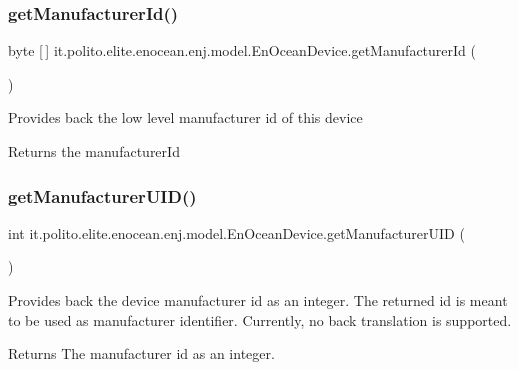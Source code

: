 \subsubsection{\texorpdfstring{get\+Manufacturer\+Id()}{getManufacturerId()}}
{\footnotesize\ttfamily byte \mbox{[}$\,$\mbox{]} it.\+polito.\+elite.\+enocean.\+enj.\+model.\+En\+Ocean\+Device.\+get\+Manufacturer\+Id (\begin{DoxyParamCaption}{ }\end{DoxyParamCaption})}

Provides back the low level manufacturer id of this device

\begin{DoxyReturn}{Returns}
the manufacturer\+Id 
\end{DoxyReturn}
\hypertarget{classit_1_1polito_1_1elite_1_1enocean_1_1enj_1_1model_1_1_en_ocean_device_a4146d6a1aa6bcac98f038151e4581708}{}\label{classit_1_1polito_1_1elite_1_1enocean_1_1enj_1_1model_1_1_en_ocean_device_a4146d6a1aa6bcac98f038151e4581708} 
\subsubsection{\texorpdfstring{get\+Manufacturer\+U\+I\+D()}{getManufacturerUID()}}
{\footnotesize\ttfamily int it.\+polito.\+elite.\+enocean.\+enj.\+model.\+En\+Ocean\+Device.\+get\+Manufacturer\+U\+ID (\begin{DoxyParamCaption}{ }\end{DoxyParamCaption})}

Provides back the device manufacturer id as an integer. The returned id is meant to be used as manufacturer identifier. Currently, no back translation is supported.

\begin{DoxyReturn}{Returns}
The manufacturer id as an integer. 
\end{DoxyReturn}
\hypertarget{classit_1_1polito_1_1elite_1_1enocean_1_1enj_1_1model_1_1_en_ocean_device_ada1db02dc3994a125199680940e69bb7}{}\label{classit_1_1polito_1_1elite_1_1enocean_1_1enj_1_1model_1_1_en_ocean_device_ada1db02dc3994a125199680940e69bb7} 
